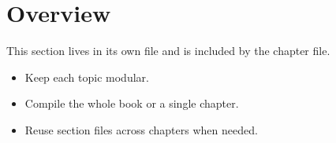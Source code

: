 \section{Overview}

This section lives in its own file and is included by the chapter file.

\begin{itemize}
  \item Keep each topic modular.
  \item Compile the whole book or a single chapter.
  \item Reuse section files across chapters when needed.
\end{itemize}

